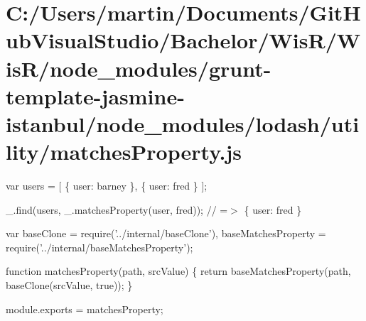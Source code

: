 \hypertarget{_c_1_2_users_2martin_2_documents_2_git_hub_visual_studio_2_bachelor_2_wis_r_2_wis_r_2node_modulef3e87de63b5abc0fd055341966021c40}{}\section{C\+:/\+Users/martin/\+Documents/\+Git\+Hub\+Visual\+Studio/\+Bachelor/\+Wis\+R/\+Wis\+R/node\+\_\+modules/grunt-\/template-\/jasmine-\/istanbul/node\+\_\+modules/lodash/utility/matches\+Property.\+js}
var users = \mbox{[} \{ \textquotesingle{}user\textquotesingle{}\+: \textquotesingle{}barney\textquotesingle{} \}, \{ \textquotesingle{}user\textquotesingle{}\+: \textquotesingle{}fred\textquotesingle{} \} \mbox{]};

\+\_\+.\+find(users, \+\_\+.\+matches\+Property(\textquotesingle{}user\textquotesingle{}, \textquotesingle{}fred\textquotesingle{})); // =$>$ \{ \textquotesingle{}user\textquotesingle{}\+: \textquotesingle{}fred\textquotesingle{} \}


\begin{DoxyCodeInclude}
var baseClone = require(\textcolor{stringliteral}{'../internal/baseClone'}),
    baseMatchesProperty = require(\textcolor{stringliteral}{'../internal/baseMatchesProperty'});

\textcolor{keyword}{function} matchesProperty(path, srcValue) \{
  \textcolor{keywordflow}{return} baseMatchesProperty(path, baseClone(srcValue, \textcolor{keyword}{true}));
\}

module.exports = matchesProperty;
\end{DoxyCodeInclude}
 